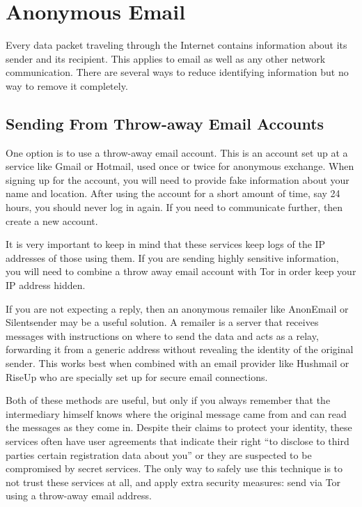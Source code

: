 \section{Anonymous Email}

Every data packet traveling through the Internet contains information
about its sender and its recipient. This applies to email as well as any
other network communication. There are several ways to reduce
identifying information but no way to remove it completely.

\subsection{Sending From Throw-away Email Accounts}

One option is to use a throw-away email account. This is an account set
up at a service like Gmail or Hotmail, used once or twice for anonymous
exchange. When signing up for the account, you will need to provide fake
information about your name and location. After using the account for a
short amount of time, say 24 hours, you should never log in again. If
you need to communicate further, then create a new account.

It is very important to keep in mind that these services keep logs of
the IP addresses of those using them. If you are sending highly
sensitive information, you will need to combine a throw away email
account with Tor in order keep your IP address hidden.

If you are not expecting a reply, then an anonymous remailer like
AnonEmail or Silentsender may be a useful solution. A remailer is a
server that receives messages with instructions on where to send the
data and acts as a relay, forwarding it from a generic address without
revealing the identity of the original sender. This works best when
combined with an email provider like Hushmail or RiseUp who are
specially set up for secure email connections.

Both of these methods are useful, but only if you always remember that
the intermediary himself knows where the original message came from and
can read the messages as they come in. Despite their claims to protect
your identity, these services often have user agreements that indicate
their right ``to disclose to third parties certain registration data
about you'' or they are suspected to be compromised by secret services.
The only way to safely use this technique is to not trust these services
at all, and apply extra security measures: send via Tor using a
throw-away email address.

